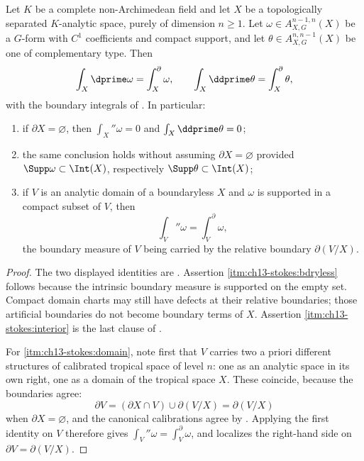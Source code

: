 \begin{theorem}
\label{thm:ch13-stokes}
Let $K$ be a complete non-Archimedean field and let $X$ be a topologically
separated $K$-analytic space, purely of dimension $n\ge1$.  Let
$\omega\in A^{n-1,n}_{X,G}(X)$ be a $G$-form with $C^1$ coefficients and
compact support, and let $\theta\in A^{n,n-1}_{X,G}(X)$ be one of complementary
type.  Then
\[
 \int_X\dprime\omega=\int_X^{\partial}\omega,
 \qquad
 \int_X\ddprime\theta=\int_X^{\partial}\theta ,
\]
with the boundary integrals of .  In
particular:
\begin{enumerate}
\item\label{itm:ch13-stokes:bdryless} if $\partial X=\varnothing$, then
  $\int_X\dprime\omega=0$ and $\int_X\ddprime\theta=0$;
\item\label{itm:ch13-stokes:interior} the same conclusion holds without
  assuming $\partial X=\varnothing$ provided
  $\Supp\omega\subset\Int(X)$, respectively
  $\Supp\theta\subset\Int(X)$;
\item\label{itm:ch13-stokes:domain} if $V$ is an analytic domain of a
  boundaryless $X$ and $\omega$ is supported in a compact subset of $V$, then
  \[
   \int_V\dprime\omega=\int^{\partial}_{V}\omega,
  \]
  the boundary measure of $V$ being carried by the relative boundary
  $\partial(V/X)$.
\end{enumerate}
\end{theorem}

\begin{proof}
The two displayed identities are .
Assertion \cref{itm:ch13-stokes:bdryless} follows because the intrinsic
boundary measure is supported on the empty set.  Compact domain charts
may still have defects at their relative boundaries; those artificial
boundaries do not become boundary terms of $X$.
Assertion \cref{itm:ch13-stokes:interior} is the last clause of
.

For \cref{itm:ch13-stokes:domain}, note first that $V$ carries two a priori
different structures of calibrated tropical space of level $n$: one as an
analytic space in its own right, one as a domain of the tropical space $X$.
These coincide, because the boundaries agree:
\[
 \partial V=(\partial X\cap V)\cup\partial(V/X)=\partial(V/X)
\]
when $\partial X=\varnothing$, and the canonical calibrations agree by
.  Applying the first identity on
$V$ therefore gives $\int_V\dprime\omega=\int^\partial_V\omega$, and
 localizes the right-hand side on
$\partial V=\partial(V/X)$.
\end{proof}


